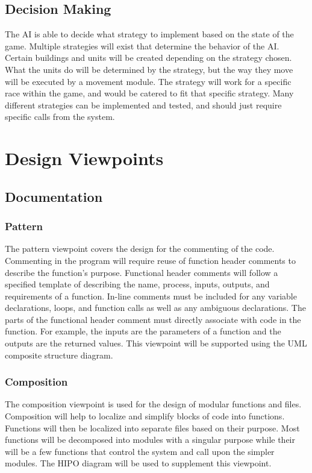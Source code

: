 \documentclass[10pt,letterpaper,onecolumn,draftclsnofoot]{IEEEtran}
\begin{document}
\subsection{Decision Making}
The AI is able to decide what strategy to implement based on the state of the game. Multiple strategies will exist that determine the behavior of the AI. Certain buildings and units will be created depending on the strategy chosen. What the units do will be determined by the strategy, but the way they move will be executed by a movement module. The strategy will work for a specific race within the game, and would be catered to fit that specific strategy. Many different strategies can be implemented and tested, and should just require specific calls from the system.
\section{Design Viewpoints}
\subsection{Documentation}
\subsubsection{Pattern}
	The pattern viewpoint covers the design for the commenting of the code. Commenting in the program will require reuse of function header comments to describe the function's purpose. Functional header comments will follow a specified template of describing the name, process, inputs, outputs, and requirements of a function. In-line comments must be included for any variable declarations, loops, and function calls as well as any ambiguous declarations. The parts of the functional header comment must directly associate with code in the function. For example, the inputs are the parameters of a function and the outputs are the returned values. This viewpoint will be supported using the UML composite structure diagram.
	
\subsubsection{Composition}
	The composition viewpoint is used for the design of modular functions and files. Composition will help to localize and simplify blocks of code into functions. Functions will then be localized into separate files based on their purpose. Most functions will be decomposed into modules with a singular purpose while their will be a few functions that control the system and call upon the simpler modules. The HIPO diagram will be used to supplement this viewpoint.
\end{document}

